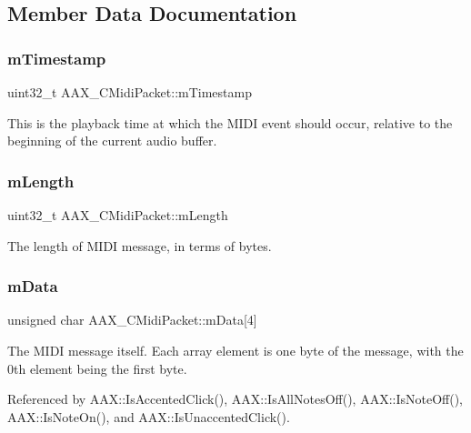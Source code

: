 \subsection{Member Data Documentation}
\mbox{\label{a01429_a76df0e71968aa1416b93015ebf23ddc5}} 
\subsubsection{\texorpdfstring{mTimestamp}{mTimestamp}}
{\footnotesize\ttfamily uint32\+\_\+t A\+A\+X\+\_\+\+C\+Midi\+Packet\+::m\+Timestamp}



This is the playback time at which the M\+I\+DI event should occur, relative to the beginning of the current audio buffer. 

\mbox{\label{a01429_aa0f16872a37737488aa42f1d9614d6a5}} 
\subsubsection{\texorpdfstring{mLength}{mLength}}
{\footnotesize\ttfamily uint32\+\_\+t A\+A\+X\+\_\+\+C\+Midi\+Packet\+::m\+Length}



The length of M\+I\+DI message, in terms of bytes. 

\mbox{\label{a01429_aac7229afc36006bc673eb219b18d8220}} 
\subsubsection{\texorpdfstring{mData}{mData}}
{\footnotesize\ttfamily unsigned char A\+A\+X\+\_\+\+C\+Midi\+Packet\+::m\+Data\mbox{[}4\mbox{]}}



The M\+I\+DI message itself. Each array element is one byte of the message, with the 0th element being the first byte. 



Referenced by A\+A\+X\+::\+Is\+Accented\+Click(), A\+A\+X\+::\+Is\+All\+Notes\+Off(), A\+A\+X\+::\+Is\+Note\+Off(), A\+A\+X\+::\+Is\+Note\+On(), and A\+A\+X\+::\+Is\+Unaccented\+Click().

